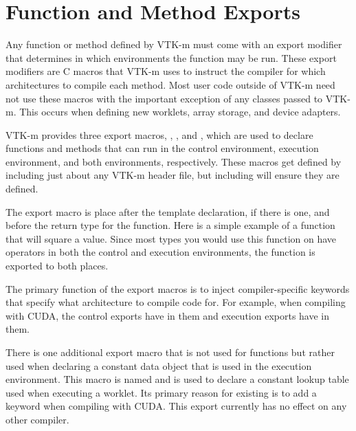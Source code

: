 

\section{Function and Method Exports}
\label{sec:FunctionAndMethodExports}

Any function or method defined by VTK-m must come with an export modifier
that determines in which environments the function may be run. These export
modifiers are C macros that VTK-m uses to instruct the compiler for which
architectures to compile each method. Most user code outside of VTK-m need
not use these macros with the important exception of any classes passed to
VTK-m. This occurs when defining new worklets, array storage, and device
adapters.

VTK-m provides three export macros, \vtkmcontexport, \vtkmexecexport, and
\vtkmexeccontexport, which are used to declare functions and methods that
can run in the control environment, execution environment, and both
environments, respectively. These macros get defined by including just
about any VTK-m header file, but including  will
ensure they are defined. 

The export macro is place after the template declaration, if there is one,
and before the return type for the function. Here is a simple example of a
function that will square a value. Since most types you would use this
function on have operators in both the control and execution environments,
the function is exported to both places.


The primary function of the export macros is to inject compiler-specific
keywords that specify what architecture to compile code for. For example,
when compiling with CUDA, the control exports have
 in them and execution exports
have  in them.

There is one additional export macro that is not used for functions but
rather used when declaring a constant data object that is used in the
execution environment. This macro is named
and is used to declare a constant lookup table used when executing a
worklet. Its primary reason for existing is to add a
 keyword when compiling with CUDA. This export
currently has no effect on any other compiler.

